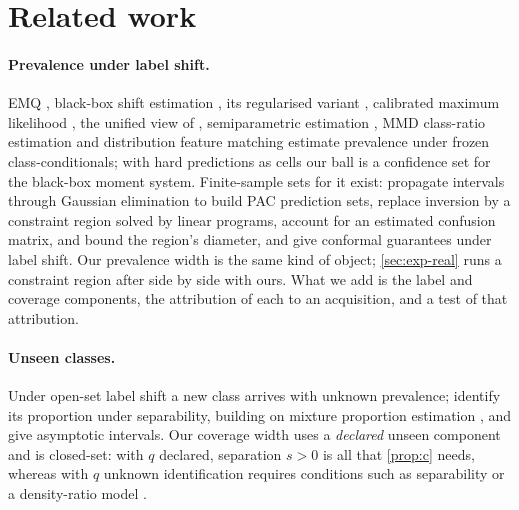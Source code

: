 \section{Related work}
\label{sec:related}

\paragraph{Prevalence under label shift.} EMQ \citep{saerens2002adjusting}, black-box shift
estimation \citep{lipton2018detecting}, its regularised variant \citep{azizzadenesheli2019regularized},
calibrated maximum likelihood \citep{alexandari2020maximum}, the unified view of
\citet{garg2020unified}, semiparametric estimation \citep{tian2023elsa}, MMD class-ratio estimation
\citep{iyer2014maximum} and distribution feature matching \citep{dussap2023label} estimate
prevalence under frozen class-conditionals; with hard predictions as cells our ball is a confidence
set for the black-box moment system. Finite-sample sets for it exist: \citet{si2023pac} propagate
intervals through Gaussian elimination to build PAC prediction sets, \citet{li2026matrix} replace
inversion by a constraint region solved by linear programs, account for an estimated confusion
matrix, and bound the region's diameter, and \citet{podkopaev2021distribution} give conformal
guarantees under label shift. Our prevalence width is the same kind of object; \cref{sec:exp-real}
runs a constraint region after \citet{li2026matrix} side by side with ours. What we add is the label
and coverage components, the attribution of each to an acquisition, and a test of that attribution.

\paragraph{Unseen classes.} Under open-set label shift a new class arrives with unknown prevalence;
\citet{garg2022domain} identify its proportion under separability, building on mixture proportion
estimation \citep{ramaswamy2016mixture,blanchard2010semi}, and \citet{liu2025semiparametric} give asymptotic intervals.
Our coverage width uses a \emph{declared} unseen component and is closed-set: with $q$ declared,
separation $s>0$ is all that \cref{prop:c} needs, whereas with $q$ unknown identification requires
conditions such as separability \citep{garg2022domain} or a density-ratio model
\citep{liu2025semiparametric}.

